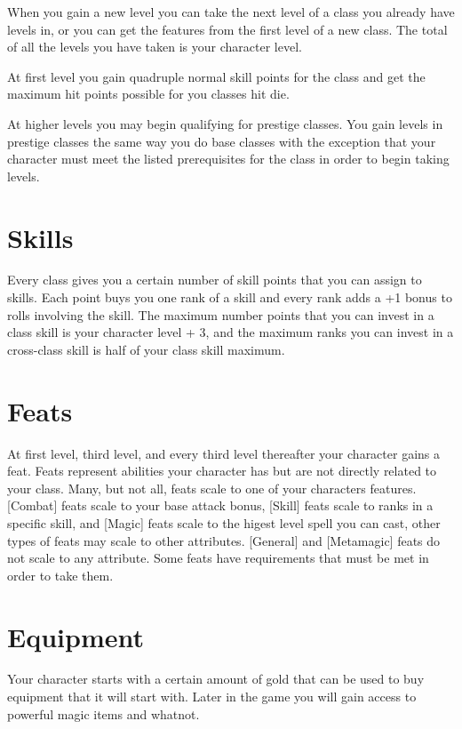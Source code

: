 When you gain a new level you can take the next level of a class you already have levels in, or you can get the features from the first level of a new class.  The total of all the levels you have taken is your character level.

At first level you gain quadruple normal skill points for the class and get the maximum hit points possible for you classes hit die.

At higher levels you may begin qualifying for prestige classes.  You gain levels in prestige classes the same way you do base classes with the exception that your character must meet the listed prerequisites for the class in order to begin taking levels.

\section{Skills}

Every class gives you a certain number of skill points that you can assign to skills.  Each point buys you one rank of a skill and every rank adds a +1 bonus to rolls involving the skill.  The maximum number points that you can invest in a class skill is your character level + 3, and the maximum ranks you can invest in a cross-class skill is half of your class skill maximum.

\section{Feats}

At first level, third level, and every third level thereafter your character gains a feat.  Feats represent abilities your character has but are not directly related to your class. Many, but not all, feats scale to one of your characters features. [Combat] feats scale to your base attack bonus, [Skill] feats scale to ranks in a specific skill, and [Magic] feats scale to the higest level spell you can cast, other types of feats may scale to other attributes.  [General] and [Metamagic] feats do not scale to any attribute.  Some feats have requirements that must be met in order to take them.

\section{Equipment}

Your character starts with a certain amount of gold that can be used to buy equipment that it will start with.  Later in the game you will gain access to powerful magic items and whatnot.
